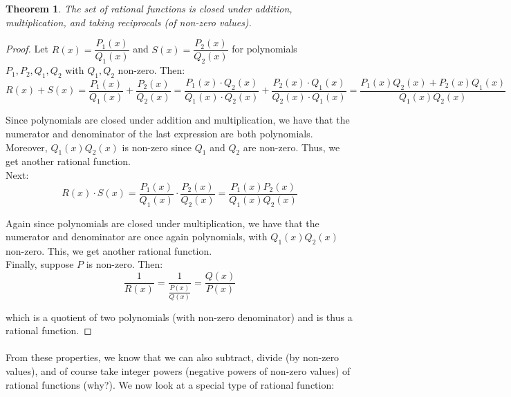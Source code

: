 \documentclass[12pt, a4paper, titlepage, twoside]{article}
\newtheorem*{theorem*}{Theorem}
\begin{document}
	\begin{pf}
		\begin{theorem*}
			The set of rational functions is closed under addition, multiplication, and taking reciprocals (of non-zero values).
		\end{theorem*}
		
		\tcbline
		
		\begin{proof}
			Let $R(x) = \dfrac{P_1(x)}{Q_1(x)}$ and $S(x) = \dfrac{P_2(x)}{Q_2(x)}$ for polynomials $P_1, P_2, Q_1, Q_2$ with
			$Q_1, Q_2$ non-zero. Then:
			\[ R(x) + S(x) = \dfrac{P_1(x)}{Q_1(x)} + \dfrac{P_2(x)}{Q_2(x)} = \dfrac{P_1(x) \cdot Q_2(x)}{Q_1(x) \cdot Q_2(x)}
			+ \dfrac{P_2(x) \cdot Q_1(x)}{Q_2(x) \cdot Q_1(x)} = \dfrac{P_1(x) Q_2(x) + P_2(x) Q_1(x)}{Q_1(x) Q_2(x)} \]
			
			Since polynomials are closed under addition and multiplication, we have that the numerator and denominator
			of the last expression are both polynomials. Moreover, $Q_1(x) Q_2(x)$ is non-zero since $Q_1$ and $Q_2$ are
			non-zero. Thus, we get another rational function.\\
			
			Next:
			\[ R(x) \cdot S(x) = \dfrac{P_1(x)}{Q_1(x)} \cdot \dfrac{P_2(x)}{Q_2(x)} = \dfrac{P_1(x)P_2(x)}{Q_1(x) Q_2(x)}  \]
			
			Again since polynomials are closed under multiplication, we have that the numerator and denominator are once again
			polynomials, with $Q_1(x) Q_2(x)$ non-zero. This, we get another rational function.\\
			
			Finally, suppose $P$ is non-zero. Then:
			\[ \dfrac{1}{R(x)} = \dfrac{1}{\tfrac{P(x)}{Q(x)}} = \dfrac{Q(x)}{P(x)} \]
			
			which is a quotient of two polynomials (with non-zero denominator) and is thus a rational function.
		\end{proof}
	\end{pf}
	
	\paragraph{}
	From these properties, we know that we can also subtract, divide (by non-zero values), and of course take integer powers (negative powers 
	of non-zero values) of rational functions (why?). We now look at a special type of rational function:\\
	
\end{document}
